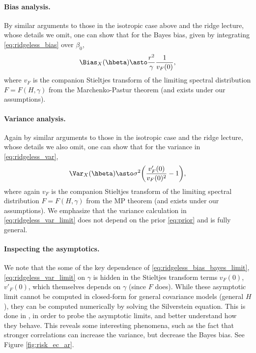 \documentclass{article}
\begin{document}
\paragraph{Bias analysis.}

By similar arguments to those in the isotropic case above and the ridge lecture,
whose details we omit, one can show that for the Bayes bias, given by
integrating \eqref{eq:ridgeless_bias} over $\beta_0$,
\begin{equation}
\label{eq:ridgeless_bias_bayes_limit}
\Bias_X(\hbeta) \asto \frac{r^2}{\gamma} \frac{1}{v_F(0)},  
\end{equation}
where $v_F$ is the companion Stieltjes transform of the limiting spectral
distribution $F = F(H, \gamma)$ from the Marchenko-Pastur theorem (and
 exists under our
assumptions).   

\paragraph{Variance analysis.}

Again by similar arguments to those in the isotropic case and the ridge lecture,
whose details we also omit, one can show that for the variance in
\eqref{eq:ridgeless_var},  
\begin{equation}
\label{eq:ridgeless_var_limit}
\Var_X(\hbeta) \asto \sigma^2 \bigg(\frac{v'_F(0)}{v_F(0)^2} - 1 \bigg),
\end{equation}
where again $v_F$ is the companion Stieltjes transform of the limiting spectral 
distribution $F = F(H, \gamma)$ from the MP theorem (and
exists under our assumptions). We emphasize that the variance calculation in 
\eqref{eq:ridgeless_var_limit} does not depend on the prior \eqref{eq:prior} and is
fully general.    

\paragraph{Inspecting the asymptotics.}

We note that the some of the key dependence of
\eqref{eq:ridgeless_bias_bayes_limit}, \eqref{eq:ridgeless_var_limit} on
$\gamma$ is hidden in the Stieltjes transform terms $v_F(0)$, $v'_F(0)$, which
themselves depends on $\gamma$ (since $F$ does). While these asymptotic limit
cannot be computed in closed-form for general covariance models (general $H$),
they can be computed numerically by solving the Silverstein equation. This is
done in \citet{hastie2022surprises}, in order to probe the asymptotic limits,
and better understand how they behave. This reveals some interesting phenomena,
such as  the fact that stronger correlations can increase the variance, but
decrease the Bayes bias. See Figure \ref{fig:risk_ec_ar}.  
\end{document}
